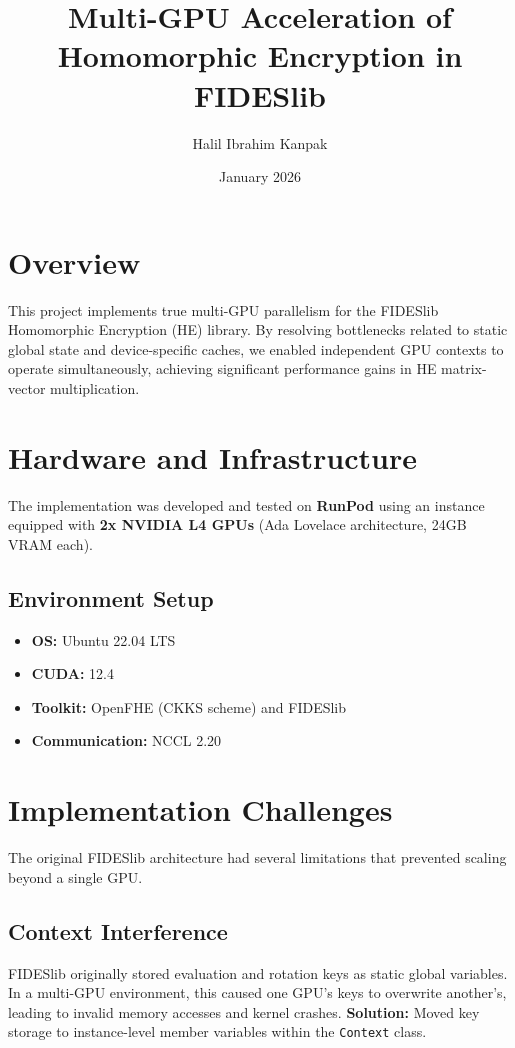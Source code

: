 \documentclass{article}
\title{Multi-GPU Acceleration of Homomorphic Encryption in FIDESlib}
\author{Halil Ibrahim Kanpak}
\date{January 2026}
\begin{document}
\maketitle

\section{Overview}
This project implements true multi-GPU parallelism for the FIDESlib Homomorphic Encryption (HE) library. By resolving bottlenecks related to static global state and device-specific caches, we enabled independent GPU contexts to operate simultaneously, achieving significant performance gains in HE matrix-vector multiplication.

\section{Hardware and Infrastructure}
The implementation was developed and tested on \textbf{RunPod} using an instance equipped with \textbf{2x NVIDIA L4 GPUs} (Ada Lovelace architecture, 24GB VRAM each). 

\subsection{Environment Setup}
\begin{itemize}
    \item \textbf{OS:} Ubuntu 22.04 LTS
    \item \textbf{CUDA:} 12.4
    \item \textbf{Toolkit:} OpenFHE (CKKS scheme) and FIDESlib
    \item \textbf{Communication:} NCCL 2.20
\end{itemize}

\section{Implementation Challenges}
The original FIDESlib architecture had several limitations that prevented scaling beyond a single GPU.

\subsection{Context Interference}
FIDESlib originally stored evaluation and rotation keys as static global variables. In a multi-GPU environment, this caused one GPU's keys to overwrite another's, leading to invalid memory accesses and kernel crashes.
\textbf{Solution:} Moved key storage to instance-level member variables within the \texttt{Context} class.
\end{document}
